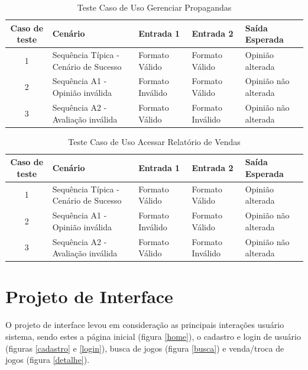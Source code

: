 \documentclass[a4paper,11pt]{article}
\begin{document}
	\begin{center}
	\begin{table}[H]
		\begin{tabularx}{\textwidth}{|c|X|X|X|X|} \hline
			\textbf{Caso de teste} & \textbf{Cenário} & \textbf{Entrada 1} & \textbf{Entrada 2} & \textbf{Saída Esperada} \\
			\hline
			1 & Sequência Típica - Cenário de Sucesso & Formato Válido & Formato Válido & Opinião alterada\\ \hline
			2 & Sequência A1 - Opinião inválida & Formato Inválido & Formato Válido & Opinião não alterada\\ \hline
			3 & Sequência A2 - Avaliação inválida & Formato Válido & Formato Inválido & Opinião não alterada\\ \hline
			
		\end{tabularx}
		\caption{Teste Caso de Uso Gerenciar Propagandas}
	\end{table}
	\end{center}
	
	\begin{center}
	\begin{table}[H]
		\begin{tabularx}{\textwidth}{|c|X|X|X|X|} \hline
			\textbf{Caso de teste} & \textbf{Cenário} & \textbf{Entrada 1} & \textbf{Entrada 2} & \textbf{Saída Esperada} \\
			\hline
			1 & Sequência Típica - Cenário de Sucesso & Formato Válido & Formato Válido & Opinião alterada\\ \hline
			2 & Sequência A1 - Opinião inválida & Formato Inválido & Formato Válido & Opinião não alterada\\ \hline
			3 & Sequência A2 - Avaliação inválida & Formato Válido & Formato Inválido & Opinião não alterada\\ \hline
			
		\end{tabularx}
		\caption{Teste Caso de Uso Acessar Relatório de Vendas}
	\end{table}
	\end{center}	
	
\section{Projeto de Interface}

O projeto de interface levou em consideração as principais interações usuário sistema, sendo estes a página inicial (figura \ref{home}), o cadastro e login de usuário (figuras \ref{cadastro} e \ref{login}), busca de jogos (figura \ref{busca}) e venda/troca de jogos (figura \ref{detalhe}).
\end{document}
